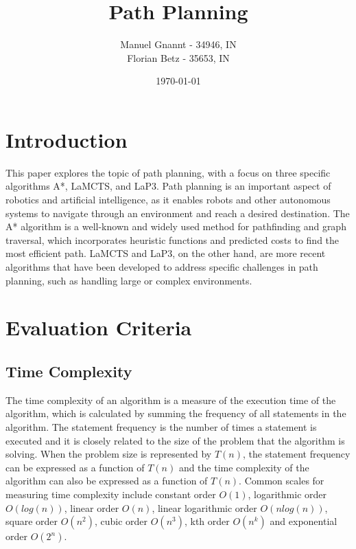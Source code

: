 \documentclass[bibliography=totoc]{scrartcl}
\title{Path Planning}
\author{Manuel Gnannt - 34946, IN \\ Florian Betz - 35653, IN}
\date{\today}
\begin{document}
\maketitle
\tableofcontents

\clearpage
\section{Introduction}

This paper explores the topic of path planning, with a focus on three specific algorithms A*, LaMCTS, and LaP3. 
Path planning is an important aspect of robotics and artificial intelligence, as it enables robots and other autonomous systems to navigate through an environment and reach a desired destination. 
The A* algorithm is a well-known and widely used method for pathfinding and graph traversal, which incorporates heuristic functions and predicted costs to find the most efficient path. 
LaMCTS and LaP3, on the other hand, are more recent algorithms that have been developed to address specific challenges in path planning, such as handling large or complex environments.

\section{Evaluation Criteria} \label{corner_detection}
\subsection{Time Complexity}
The time complexity of an algorithm is a measure of the execution time of the algorithm, which is calculated by summing the frequency of all statements in the algorithm. 
The statement frequency is the number of times a statement is executed and it is closely related to the size of the problem that the algorithm is solving. 
When the problem size is represented by $T(n)$, the statement frequency can be expressed as a function of $T(n)$ and the time complexity of the algorithm can also be expressed as a function of $T(n)$. \cite[p. 248 l. 22 ]{TheoryComputation}
Common scales for measuring time complexity include constant order $O(1)$, logarithmic order $O(log(n))$, linear order $O(n)$, linear logarithmic order $O(nlog(n))$, square order $O(n^2)$, cubic order $O(n^3)$, kth order $O(n^k)$ and exponential order $O(2^n)$.
\end{document}
